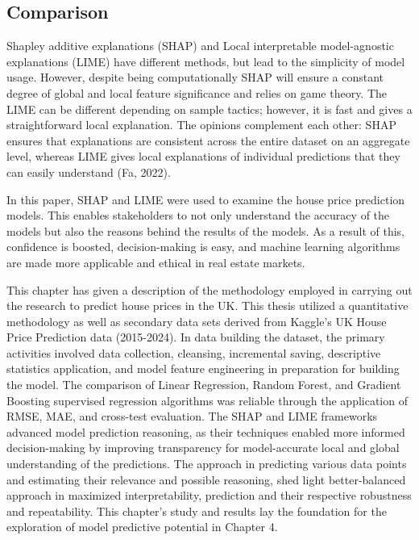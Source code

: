 \documentclass[12pt, a4paper, oneside]{book}
\begin{document}
\subsection*{Comparison}

Shapley additive explanations (SHAP) and Local interpretable model-agnostic explanations (LIME) have different methods, but lead to the simplicity of model usage. However, despite being computationally SHAP will ensure a constant degree of global and local feature significance and relies on game theory. The LIME can be different depending on sample tactics; however, it is fast and gives a straightforward local explanation. The opinions complement each other: SHAP ensures that explanations are consistent across the entire dataset on an aggregate level, whereas LIME gives local explanations of individual predictions that they can easily understand (Fa, 2022).


In this paper, SHAP and LIME were used to examine the house price prediction models. This enables stakeholders to not only understand the accuracy of the models but also the reasons behind the results of the models. As a result of this, confidence is boosted, decision-making is easy, and machine learning algorithms are made more applicable and ethical in real estate markets.


This chapter has given a description of the methodology employed in carrying out the research to predict house prices in the UK. This thesis utilized a quantitative methodology as well as secondary data sets derived from Kaggle's UK House Price Prediction data (2015-2024). In data building the dataset, the primary activities involved data collection, cleansing, incremental saving, descriptive statistics application, and model feature engineering in preparation for building the model. The comparison of Linear Regression, Random Forest, and Gradient Boosting supervised regression algorithms was reliable through the application of RMSE, MAE, and cross-test evaluation. The SHAP and LIME frameworks advanced model prediction reasoning, as their techniques enabled more informed decision-making by improving transparency for model-accurate local and global understanding of the predictions. The approach in predicting various data points and estimating their relevance and possible reasoning, shed light better-balanced approach in maximized interpretability, prediction and their respective robustness and repeatability. This chapter's study and results lay the foundation for the exploration of model predictive potential in Chapter 4.
\end{document}
